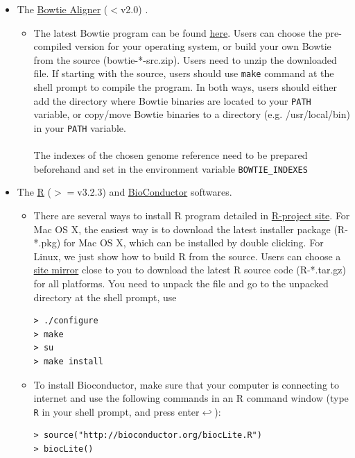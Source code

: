 \documentclass[12pt]{article}
\begin{document}
\begin{itemize}
 \item The \href{http://bowtie-bio.sourceforge.net/manual.shtml}{ Bowtie Aligner} ($<$v2.0) \cite{Langmead2009}.

\begin{itemize}
 \item The latest Bowtie program can be found \href{http://sourceforge.net/projects/bowtie-bio/files/bowtie/0.12.7}{ here}. Users can choose the pre-compiled version for your operating system, or build your own Bowtie from the source (bowtie-*-src.zip). Users need to unzip the downloaded file. If starting with the source, users should use \verb+make+ command at the shell prompt to compile the program. In both ways, users should either add the directory where Bowtie binaries are located to your \verb+PATH+ variable, or copy/move Bowtie binaries to a directory (e.g. /usr/local/bin) in your \verb+PATH+ variable.\\\\
The indexes of the chosen genome reference need to be prepared beforehand and set in the environment variable \verb|BOWTIE_INDEXES|
\end{itemize}

 \item The \href{http://www.r-project.org/}{ R} ($>=$v3.2.3) \cite{Rcitation} and \href{http://www.bioconductor.org/}{ BioConductor} \cite{Robert2004} softwares.

\begin{itemize}
 \item There are several ways to install R program detailed in \href{http://cran.r-project.org/doc/manuals/R-admin.html#}{ R-project site}. For Mac OS X, the easiest way is to download the latest installer package (R-*.pkg) for Mac OS X, which can be installed by double clicking.  For Linux, we just show how to build R from the source.  Users can choose a \href{http://cran.r-project.org/mirrors.html}{ site mirror} close to you to download the latest R source code (R-*.tar.gz) for all platforms. You need to unpack the file and go to the unpacked directory at the shell prompt, use
\begin{verbatim}
> ./configure
> make
> su
> make install
\end{verbatim} 
\end{itemize}

\begin{itemize}
 \item To install Bioconductor, make sure that your computer is connecting to internet and use the following commands in an R command window (type \verb+R+ in your shell prompt, and press enter$ \hookleftarrow $):
\begin{verbatim}
> source("http://bioconductor.org/biocLite.R")
> biocLite()
\end{verbatim} 
\end{itemize}


\end{itemize}
\end{document}
